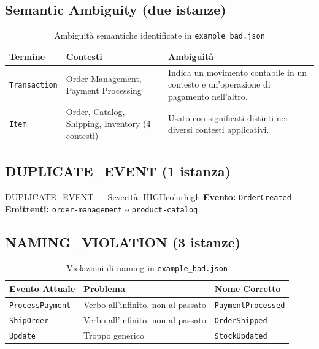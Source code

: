 \documentclass[12pt,a4paper]{report}
\begin{document}
\subsection{Semantic Ambiguity (due istanze)}

\begin{table}[H]
\centering
\renewcommand{\arraystretch}{1.3}
\begin{tabularx}{\textwidth}{l X X}
\toprule
\textbf{Termine} & \textbf{Contesti} & \textbf{Ambiguità} \\
\midrule
\texttt{Transaction} &
Order Management, Payment Processing &
Indica un movimento contabile in un contesto e un'operazione di pagamento nell'altro. \\

\texttt{Item} &
Order, Catalog, Shipping, Inventory (4 contesti) &
Usato con significati distinti nei diversi contesti applicativi. \\
\bottomrule
\end{tabularx}
\caption{Ambiguità semantiche identificate in \texttt{example\_bad.json}}
\label{tab:semantic_ambiguity}
\end{table}

\subsection{DUPLICATE\_EVENT (1 istanza)}

\begin{issuebox}{DUPLICATE\_EVENT --- Severità: HIGH}{colorhigh}
\textbf{Evento:} \texttt{OrderCreated} \\
\textbf{Emittenti:} \texttt{order-management} e \texttt{product-catalog}
\end{issuebox}

\subsection{NAMING\_VIOLATION (3 istanze)}

\begin{table}[H]
\centering
\renewcommand{\arraystretch}{1.4}
\begin{tabularx}{\textwidth}{l X l}
\toprule
\textbf{Evento Attuale} & \textbf{Problema} & \textbf{Nome Corretto} \\
\midrule
\texttt{ProcessPayment} & Verbo all'infinito, non al passato & \texttt{PaymentProcessed} \\
\texttt{ShipOrder}      & Verbo all'infinito, non al passato & \texttt{OrderShipped} \\
\texttt{Update}         & Troppo generico                    & \texttt{StockUpdated} \\
\bottomrule
\end{tabularx}
\caption{Violazioni di naming in \texttt{example\_bad.json}}
\label{tab:naming}
\end{table}
\end{document}
